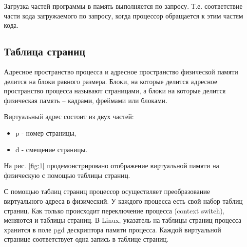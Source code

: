 Загрузка частей программы в память выполняется по запросу. 
Т.е. соответствие части кода загружаемого по запросу, когда процессор обращается к этим частям кода.

\subsection{Таблица страниц}

Адресное пространство процесса и адресное пространство физической памяти делится на блоки равного размера. Блоки, на которые делится адресное пространство процесса называют страницами, а блоки на которые делится физическая память – кадрами, фреймами или блоками.

Виртуальный адрес состоит из двух частей:

\begin{itemize}
	\item p - номер страницы,
	\item d - смещение страницы.
\end{itemize}

На рис. \ref{fig:1} продемонстрировано отображение виртуальной памяти на физическую с помощью таблицы страниц.

\begin{figure}[ht!]
\end{figure}

\newpage


С помощью таблиц страниц процессор осуществляет 
преобразование виртуального адреса в физический. 
У каждого процесса есть свой набор таблиц страниц.
Как только происходит переключение процесса (context switch), меняются и таблицы страниц. 
В Linux, указатель на таблицы страниц процесса хранится в поле pgd дескриптора памяти процесса. 
Каждой виртуальной странице соответствует одна запись в таблице страниц.

